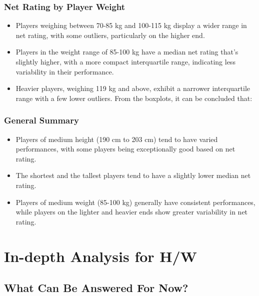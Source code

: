 \documentclass[
]{book}
\providecommand{\tightlist}{%
  \setlength{\itemsep}{0pt}\setlength{\parskip}{0pt}}
\begin{document}
\hypertarget{net-rating-by-player-weight}{%
\subsection{Net Rating by Player Weight}\label{net-rating-by-player-weight}}

\begin{itemize}
\tightlist
\item
  Players weighing between 70-85 kg and 100-115 kg display a wider range in net rating, with some outliers, particularly on the higher end.
\item
  Players in the weight range of 85-100 kg have a median net rating that's slightly higher, with a more compact interquartile range, indicating less variability in their performance.
\item
  Heavier players, weighing 119 kg and above, exhibit a narrower interquartile range with a few lower outliers.
  From the boxplots, it can be concluded that:
\end{itemize}

\hypertarget{general-summary}{%
\subsection{General Summary}\label{general-summary}}

\begin{itemize}
\tightlist
\item
  Players of medium height (190 cm to 203 cm) tend to have varied performances, with some players being exceptionally good based on net rating.
\item
  The shortest and the tallest players tend to have a slightly lower median net rating.
\item
  Players of medium weight (85-100 kg) generally have consistent performances, while players on the lighter and heavier ends show greater variability in net rating.
\end{itemize}

\hypertarget{in-depth-analysis-for-hw}{%
\chapter{In-depth Analysis for H/W}\label{in-depth-analysis-for-hw}}

\hypertarget{what-can-be-answered-for-now}{%
\section{What Can Be Answered For Now?}\label{what-can-be-answered-for-now}}
\end{document}
